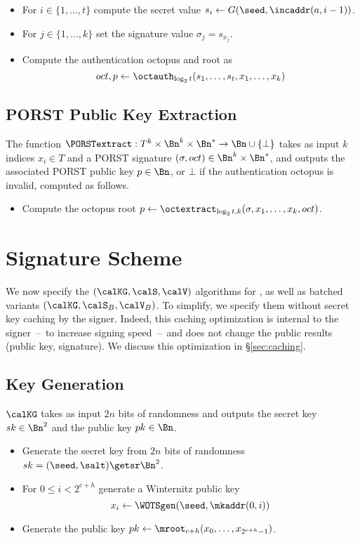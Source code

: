 \begin{itemize}
\item For $i \in \{1, \ldots, t\}$ compute the secret value $s_i \gets G(\seed, \incaddr(a, i-1))$.
\item For $j \in \{1, \ldots, k\}$ set the signature value $\sigma_j = s_{x_j}$.
\item Compute the authentication octopus and root as\[oct, p \gets \octauth_{\log_2{t}}(s_1, \ldots, s_t, x_1, \ldots, x_k)\]
\end{itemize}

\subsection{PORST Public Key Extraction}

The function $\PORSTextract : T^k \times \Bn^k \times \Bn^* \to \Bn \cup \{\bot\}$ takes as input $k$ indices $x_i \in T$ and a PORST signature $(\sigma, oct) \in \Bn^k \times \Bn^*$, and outputs the associated PORST public key $p \in \Bn$, or $\bot$ if the authentication octopus is invalid, computed as follows.

\begin{itemize}
\item Compute the octopus root $p \gets \octextract_{\log_2{t},k}(\sigma, x_1, \ldots, x_k, oct)$.
\end{itemize}


\section{Signature Scheme}

We now specify the $(\calKG, \calS, \calV)$ algorithms for \gravity{}, as well as batched variants $(\calKG, \calS_B, \calV_B)$.
To simplify, we specify them without secret key caching by the signer.
Indeed, this caching optimization is internal to the signer~--~to increase signing speed~--~and does not change the public results (public key, signature).
We discuss this optimization in \S\ref{sec:caching}.

\subsection{Key Generation}

$\calKG$ takes as input $2n$ bits of randomness and outputs the secret key $sk \in \Bn^2$ and the public key $pk \in \Bn$.

\begin{itemize}
\item Generate the secret key from $2n$ bits of randomness $sk = (\seed, \salt) \getsr \Bn^2$.
\item For $0 \le i < 2^{c+h}$ generate a Winternitz public key
    \[x_i \gets \WOTSgen(\seed, \mkaddr(0, i))\]
\item Generate the public key $pk \gets \mroot_{c+h}(x_0, \ldots, x_{2^{c+h}-1})$.
\end{itemize}

